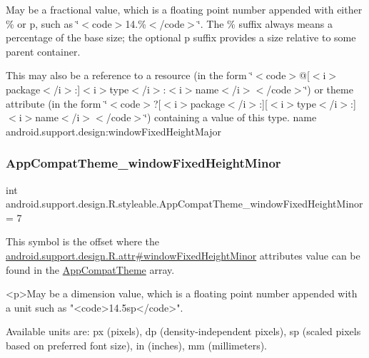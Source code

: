 May be a fractional value, which is a floating point number appended with either \% or p, such as \char`\"{}$<$code$>$14.\%$<$/code$>$\char`\"{}. The \% suffix always means a percentage of the base size; the optional p suffix provides a size relative to some parent container. 

This may also be a reference to a resource (in the form \char`\"{}$<$code$>$@\mbox{[}$<$i$>$package$<$/i$>$\+:\mbox{]}$<$i$>$type$<$/i$>$\+:$<$i$>$name$<$/i$>$$<$/code$>$\char`\"{}) or theme attribute (in the form \char`\"{}$<$code$>$?\mbox{[}$<$i$>$package$<$/i$>$\+:\mbox{]}\mbox{[}$<$i$>$type$<$/i$>$\+:\mbox{]}$<$i$>$name$<$/i$>$$<$/code$>$\char`\"{}) containing a value of this type.  name android.\+support.\+design\+:window\+Fixed\+Height\+Major \mbox{\label{classandroid_1_1support_1_1design_1_1R_1_1styleable_a772ad7624fd50e19bc24adae7d61f335}} 
\subsubsection{\texorpdfstring{App\+Compat\+Theme\+\_\+window\+Fixed\+Height\+Minor}{AppCompatTheme\_windowFixedHeightMinor}}
{\footnotesize\ttfamily int android.\+support.\+design.\+R.\+styleable.\+App\+Compat\+Theme\+\_\+window\+Fixed\+Height\+Minor = 7\hspace{0.3cm}{\ttfamily [static]}}

This symbol is the offset where the \hyperlink{classandroid_1_1support_1_1design_1_1R_1_1attr_a0428452c793d06bca6f0778aad10a812}{android.\+support.\+design.\+R.\+attr\#window\+Fixed\+Height\+Minor} attribute\textquotesingle{}s value can be found in the \hyperlink{classandroid_1_1support_1_1design_1_1R_1_1styleable_afb351dc8de20cbd4c89abe360373010c}{App\+Compat\+Theme} array.

\begin{DoxyVerb}      <p>May be a dimension value, which is a floating point number appended with a unit such as "<code>14.5sp</code>".
\end{DoxyVerb}
 Available units are\+: px (pixels), dp (density-\/independent pixels), sp (scaled pixels based on preferred font size), in (inches), mm (millimeters). 

